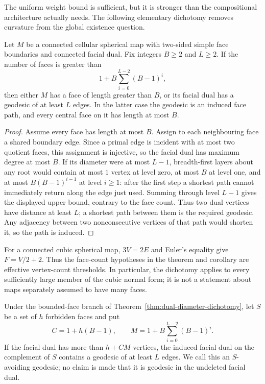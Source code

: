 The uniform weight bound is sufficient, but it is stronger than the
compositional architecture actually needs.  The following elementary
dichotomy removes curvature from the global existence question.

\begin{theorem}
\label{thm:dual-diameter-dichotomy}
Let $M$ be a connected cellular spherical map with two-sided simple face
boundaries and connected facial dual.  Fix integers $B\ge2$ and $L\ge2$.  If
the number of faces is greater than
\[
       1+B\sum_{i=0}^{L-2}(B-1)^i,
\]
then either $M$ has a face of length greater than $B$, or its facial dual has
a geodesic of at least $L$ edges.  In the latter case the geodesic is an
induced face path, and every central face on it has length at most $B$.
\end{theorem}

\begin{proof}
Assume every face has length at most $B$.  Assign to each neighbouring face
a shared boundary edge.  Since a primal edge is incident with at most two
quotient faces, this assignment is injective, so the facial dual has maximum
degree at most $B$.  If its diameter were at most $L-1$, breadth-first layers about any
root would contain at most $1$ vertex at level zero, at most $B$ at level
one, and at most $B(B-1)^{i-1}$ at level $i\ge1$: after the first step a
shortest path cannot immediately return along the edge just used.  Summing
through level $L-1$ gives the displayed upper bound, contrary to the face
count.  Thus two dual vertices have distance at least $L$; a shortest path
between them is the required geodesic.  Any adjacency between two
nonconsecutive vertices of that path would shorten it, so the path is
induced.
\end{proof}

For a connected cubic spherical map, $3V=2E$ and Euler's equality give
$F=V/2+2$.  Thus the face-count hypotheses in the theorem and corollary are
effective vertex-count thresholds.  In particular, the dichotomy applies
to every sufficiently large member of the cubic normal form; it is not a
statement about maps separately assumed to have many faces.

\begin{corollary}
\label{cor:dual-geodesic-avoids}
Under the bounded-face branch of
Theorem~\ref{thm:dual-diameter-dichotomy}, let $S$ be a set of $h$ forbidden
faces and put
\[
 C=1+h(B-1),\qquad
 M=1+B\sum_{i=0}^{L-2}(B-1)^i.
\]
If the facial dual has more than $h+CM$ vertices, the induced facial dual on
the complement of $S$ contains a geodesic of at least $L$ edges.  We call
this an $S$-avoiding geodesic; no claim is made that it is geodesic in the
undeleted facial dual.
\end{corollary}

